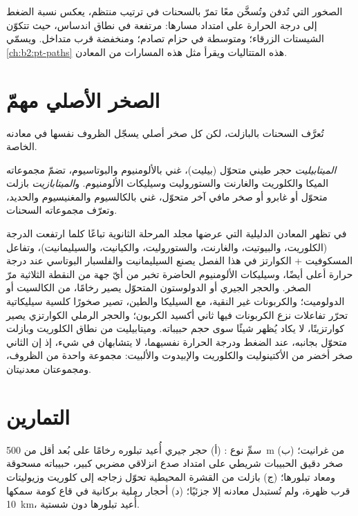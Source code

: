 الصخور التي تُدفن وتُسخَّن معًا تمرّ بالسحنات في ترتيب منتظم، يعكس
نسبة الضغط إلى درجة الحرارة على امتداد مسارها: مرتفعة في نطاق
اندساس، حيث تتكوّن الشيستات الزرقاء؛ ومتوسطة في حزام تصادم؛ ومنخفضة قرب متداخل.
ويسمّي \cref{ch:b2:pt-paths} هذه المتتاليات ويقرأ مثل هذه المسارات من المعادن.

\section{الصخر الأصلي مهمّ}\label{sec:b2:metamorphic-facies:protoliths}

تُعرَّف السحنات بالبازلت، لكن كل صخر أصلي يسجّل الظروف نفسها في
معادنه الخاصة.

\begin{definition}\label{def:b2:metamorphic-facies:protoliths}
\emph{الميتابيليت} حجر طيني متحوّل (بيليت)، غني
بالألومنيوم والبوتاسيوم، تضمّ مجموعاته الميكا والكلوريت والغارنت والستوروليت
وسيليكات الألومنيوم. و\emph{الميتابازيت} بازلت متحوّل أو
غابرو أو صخر مافي آخر متحوّل، غني بالكالسيوم والمغنيسيوم والحديد، وتعرّف مجموعاته
السحنات.
\end{definition}

في  تظهر المعادن الدليلية التي عرضها مجلد المرحلة الثانوية تباعًا كلما
ارتفعت الدرجة (الكلوريت، والبيوتيت، والغارنت، والستوروليت، والكيانيت، والسيليمانيت)،
وتفاعل المسكوفيت + الكوارتز في هذا الفصل يصنع السيليمانيت والفلسبار البوتاسي عند درجة
حرارة أعلى أيضًا، وسيليكات الألومنيوم الحاضرة تخبر من أيّ جهة من النقطة
الثلاثية مرّ الصخر. والحجر الجيري أو الدولوستون المتحوّل يصير رخامًا، من الكالسيت أو
الدولوميت؛ والكربونات غير النقية، مع السيليكا والطين، تصير صخورًا كلسية سيليكاتية تحرّر
تفاعلات نزع الكربونات فيها ثاني أكسيد الكربون؛ والحجر الرملي الكوارتزي يصير كوارتزيتًا،
لا يكاد يُظهر شيئًا سوى حجم حبيباته. وميتابيليت من نطاق الكلوريت
وبازلت متحوّل بجانبه، عند الضغط ودرجة الحرارة نفسيهما، لا يتشابهان في شيء، إذ إن
الثاني صخر أخضر من الأكتينوليت والكلوريت والإبيدوت والألبيت: مجموعة واحدة من الظروف،
ومجموعتان معدنيتان.

\section{التمارين}

\begin{exercise}[$\star$]\label{exo:b2:metamorphic-facies:1}
سمِّ نوع : (أ) حجر جيري أُعيد تبلوره رخامًا على بُعد أقل من
\qty{500}{m} من غرانيت؛ (ب) صخر دقيق الحبيبات شريطي على امتداد صدع
انزلاقي مضربي كبير، حبيباته مسحوقة ومعاد تبلورها؛ (ج) بازلت من القشرة المحيطية تحوّل
زجاجه إلى كلوريت وزيوليتات قرب ظهرة، ولم تُستبدل معادنه إلا
جزئيًا؛ (د) أحجار رملية بركانية في قاع كومة سمكها \qty{10}{km}،
أُعيد تبلورها دون شستية.
\end{exercise}

